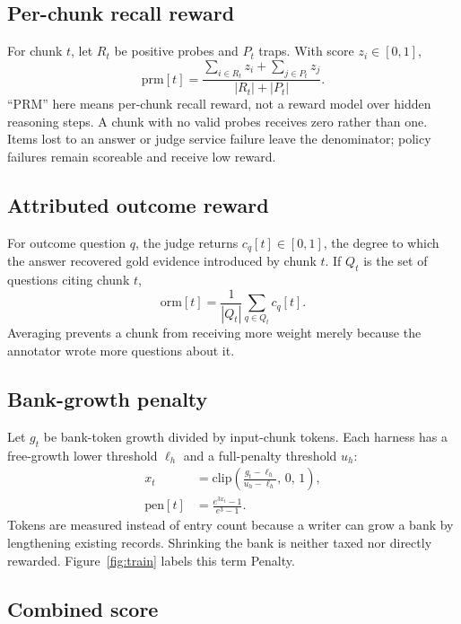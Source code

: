 \documentclass{article}
\begin{document}
\subsection{Per-chunk recall reward}

For chunk $t$, let $R_t$ be positive probes and $P_t$ traps. With score $z_i\in[0,1]$,
\begin{equation}
\mathrm{prm}[t]
=\frac{\sum_{i\in R_t} z_i+\sum_{j\in P_t} z_j}{|R_t|+|P_t|}.
\end{equation}
``PRM'' here means per-chunk recall reward, not a reward model over hidden reasoning steps. A chunk with no valid probes receives zero rather than one. Items lost to an answer or judge service failure leave the denominator; policy failures remain scoreable and receive low reward.

\subsection{Attributed outcome reward}

For outcome question $q$, the judge returns $c_q[t]\in[0,1]$, the degree to which the answer recovered gold evidence introduced by chunk $t$. If $Q_t$ is the set of questions citing chunk $t$,
\begin{equation}
\mathrm{orm}[t]=\frac{1}{|Q_t|}\sum_{q\in Q_t}c_q[t].
\end{equation}
Averaging prevents a chunk from receiving more weight merely because the annotator wrote more questions about it.

\subsection{Bank-growth penalty}

Let $g_t$ be bank-token growth divided by input-chunk tokens. Each harness has a free-growth lower threshold $\ell_h$ and a full-penalty threshold $u_h$:
\begin{align}
x_t &= \mathrm{clip}\!\left(\frac{g_t-\ell_h}{u_h-\ell_h},\,0,\,1\right), \nonumber \\
\mathrm{pen}[t] &= \frac{e^{3x_t}-1}{e^3-1}.
\end{align}
Tokens are measured instead of entry count because a writer can grow a bank by lengthening existing records. Shrinking the bank is neither taxed nor directly rewarded. Figure~\ref{fig:train} labels this term Penalty.

\subsection{Combined score}
\end{document}
